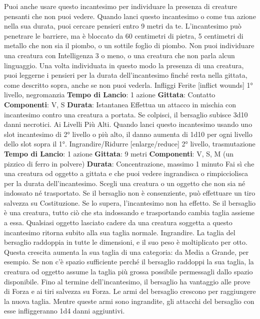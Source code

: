 \begin{multicols}{2}
Puoi anche usare questo incantesimo per individuare la
presenza di creature pensanti che non puoi vedere.
Quando lanci questo incantesimo o come tua azione
nella sua durata, puoi cercare pensieri entro 9 metri da
te. L’incantesimo può penetrare le barriere, ma è
bloccato da 60 centimetri di pietra, 5 centimetri di
metallo che non sia il piombo, o un sottile foglio di
piombo. Non puoi individuare una creatura con
Intelligenza 3 o meno, o una creatura che non parla
alcun linguaggio.
Una volta individuata in questo modo la presenza di
una creatura, puoi leggerne i pensieri per la durata
dell’incantesimo finché resta nella gittata, come
descritto sopra, anche se non puoi vederla.
Infliggi Ferite
[inflict wounds]
1° livello, negromanzia
\textbf{Tempo di Lancio}: 1 azione
\textbf{Gittata}: Contatto
\textbf{Componenti}: V, S
\textbf{Durata}: Istantanea
Effettua un attacco in mischia con incantesimo contro
una creatura a portata. Se colpisci, il bersaglio subisce
3d10 danni necrotici.
Ai Livelli Più Alti. Quando lanci questo incantesimo
usando uno slot incantesimo di 2° livello o più alto, il
danno aumenta di 1d10 per ogni livello dello slot sopra
il 1°.
Ingrandire/Ridurre
[enlarge/reduce]
2° livello, trasmutazione
\textbf{Tempo di Lancio}: 1 azione
\textbf{Gittata}: 9 metri
\textbf{Componenti}: V, S, M (un pizzico di ferro in polvere)
\textbf{Durata}: Concentrazione, massimo 1 minuto
Fai sì che una creatura od oggetto a gittata e che puoi
vedere ingrandisca o rimpicciolisca per la durata
dell’incantesimo. Scegli una creatura o un oggetto che
non sia né indossato né trasportato. Se il bersaglio non
è consenziente, può effettuare un tiro salvezza su
Costituzione. Se lo supera, l’incantesimo non ha effetto.
Se il bersaglio è una creatura, tutto ciò che sta
indossando e trasportando cambia taglia assieme a
essa. Qualsiasi oggetto lasciato cadere da una creatura
soggetta a questo incantesimo ritorna subito alla sua
taglia normale.
Ingrandire. La taglia del bersaglio raddoppia in tutte le
dimensioni, e il suo peso è moltiplicato per otto. Questa
crescita aumenta la sua taglia di una categoria: da
Media a Grande, per esempio. Se non c’è spazio
sufficiente perché il bersaglio raddoppi la sua taglia, la
creatura od oggetto assume la taglia più grossa
possibile permessagli dallo spazio disponibile. Fino al
termine dell’incantesimo, il bersaglio ha vantaggio alle
prove di Forza e ai tiri salvezza su Forza. Le armi del
bersaglio crescono per raggiungere la nuova taglia.
Mentre queste armi sono ingrandite, gli attacchi del
bersaglio con esse infliggeranno 1d4 danni aggiuntivi.

\end{multicols}
